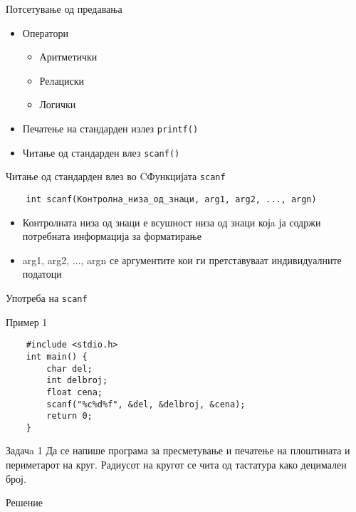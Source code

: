 

\begin{frame}{Потсетување од предавања}
\begin{itemize}
	\item Оператори
	\begin{itemize}
		\item Аритметички
		\item Релациски
		\item Логички
	\end{itemize}
	\item Печатење на стандарден излез
	\texttt{printf()}
	\item Читање од стандарден влез
	\texttt{scanf()}
\end{itemize}
\end{frame}

\begin{frame}[fragile]{Читање од стандарден влез во C}{Функцијата
\texttt{scanf}}
	\begin{verbatim}
	int scanf(Контролна_низа_од_знаци, arg1, arg2, ..., argn)	
	\end{verbatim}	
	\begin{itemize}
	\item Контролната низа од знаци е всушност низа од знаци којa ја содржи потребната информација за форматирање	
	\item arg1, arg2, ..., argn се аргументите кои ги претставуваат индивидуалните податоци
	\end{itemize}	 
\end{frame}

\begin{frame}[fragile]{Употреба на \texttt{scanf}}

	\begin{exampleblock}{Пример 1}
	\begin{lstlisting}
	#include <stdio.h>
	int main() {
	    char del;
	    int delbroj;
	    float cena;
	    scanf("%c%d%f", &del, &delbroj, &cena);
	    return 0;
	}
	\end{lstlisting}
	\end{exampleblock}

\end{frame}

\begin{frame}[fragile]{Задачa 1}
Да се напише програма за пресметување и печатење на плоштината и периметарот на круг. 
Радиусот на кругот се чита од тастатура како децимален број.
\begin{exampleblock}{Решение}

\end{exampleblock}
\end{frame}



